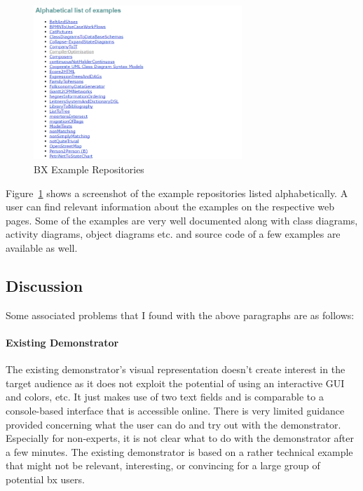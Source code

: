\begin{figure}
	\includegraphics[width=0.7\textwidth]{figures/Bx_ExampleRepo}
	\caption{BX Example Repositories}
	\label{fig:Bx_ExampleRepo}
\end{figure}

Figure~\ref{fig:Bx_ExampleRepo} shows a screenshot of the example repositories listed alphabetically. A user can find relevant information about the examples on the respective web pages. Some of the examples are very well documented along with class diagrams, activity diagrams, object diagrams etc. and source code of a few examples are available as well.

\subsection{Discussion}\label{subsec:discussion}
Some associated problems that I found with the above paragraphs are as follows: 

\paragraph{Existing Demonstrator}
The existing demonstrator's visual representation doesn't create interest in the target audience as it does not exploit the potential of using an interactive GUI and colors, etc. It just makes use of two text fields and is comparable to a console-based interface that is accessible online.
\newline\newline There is very limited guidance provided concerning what the user can do and try out with the demonstrator. Especially for non-experts, it is not clear what to do with the demonstrator after a few minutes.
\newline\newline The existing demonstrator is based on a rather technical example that might not be relevant, interesting, or convincing for a large group of potential bx users.

